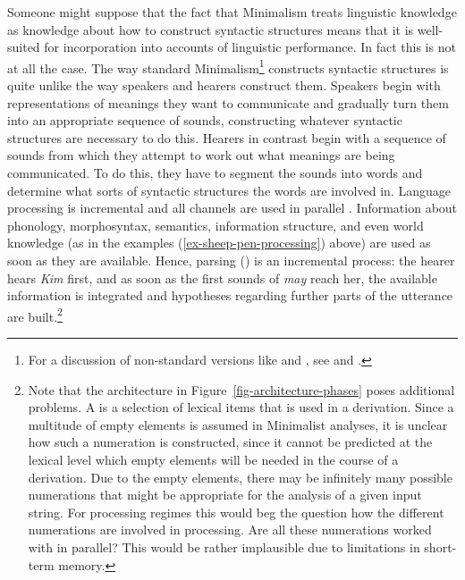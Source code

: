 \documentclass[output=paper
 	        ,biblatex
                ,babelshorthands
                ,newtxmath
                ,draftmode
                ,colorlinks, citecolor=brown
]{langscibook}
\begin{document}
Someone might suppose that the fact that Minimalism treats linguistic knowledge as knowledge about
how to construct syntactic structures means that it is well-suited for incorporation into accounts
of linguistic performance. In fact this is not at all the case. The way standard
Minimalism\footnote{%
For a discussion of non-standard versions like \citet{Phillips2003a} and \citet{Chesi2015a-u}, see
 and .%
} constructs syntactic structures is quite unlike the way speakers and hearers construct them. Speakers begin
with representations of meanings they want to communicate and gradually turn them into an
appropriate sequence of sounds, constructing whatever syntactic structures are necessary to do
this. Hearers in contrast begin with a sequence of sounds from which they attempt to work out what
meanings are being communicated. To do this, they have to segment the sounds into words and
determine what sorts of syntactic structures the words are involved in. 
Language processing is incremental and all channels are used in
parallel \citep{Marslen-Wilson75a,TSKES95a,TSKES96a}. Information about phonology, morphosyntax, semantics, information structure, and even
world knowledge (as in the examples (\ref{ex-sheep-pen-processing}) above) are used as soon as they
are available. Hence, parsing () is an incremental process: the hearer hears \emph{Kim} first,
and as soon as the first sounds of \emph{may} reach her, the available information is integrated
and hypotheses regarding further parts of the utterance are built.\footnote{\label{fn-numeration}%
  Note that the architecture in Figure~\ref{fig-architecture-phases} poses additional problems. A
  \emph{} is a selection of lexical items that is used in a derivation. Since a multitude
  of empty elements is assumed in Minimalist analyses, it is unclear how such a numeration is
  constructed, since it cannot be predicted at the lexical level which empty elements will be needed in the course of a
  derivation. Due to the empty elements, there may be infinitely many possible numerations
that might be  appropriate for the analysis of a given input string. For processing regimes this
would beg the question how the different numerations are involved in processing. Are all these
numerations worked with in parallel? This would be rather implausible due to limitations in
short-term memory.
}
\end{document}
